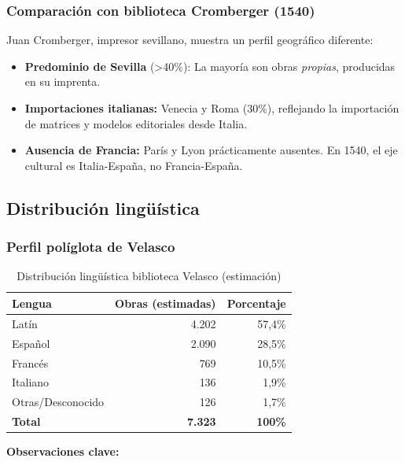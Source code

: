 \documentclass[12pt,a4paper]{article}
\begin{document}
\subsubsection{Comparación con biblioteca Cromberger (1540)}

Juan Cromberger, impresor sevillano, muestra un perfil geográfico diferente:

\begin{itemize}
\item \textbf{Predominio de Sevilla} (>40\%): La mayoría son obras \textit{propias}, producidas en su imprenta.

\item \textbf{Importaciones italianas:} Venecia y Roma (30\%), reflejando la importación de matrices y modelos editoriales desde Italia.

\item \textbf{Ausencia de Francia:} París y Lyon prácticamente ausentes. En 1540, el eje cultural es Italia-España, no Francia-España.
\end{itemize}

\subsection{Distribución lingüística}

\subsubsection{Perfil políglota de Velasco}

\begin{table}[h]
\centering
\begin{tabular}{lrr}
\toprule
\textbf{Lengua} & \textbf{Obras (estimadas)} & \textbf{Porcentaje} \\
\midrule
Latín & 4.202 & 57,4\% \\
Español & 2.090 & 28,5\% \\
Francés & 769 & 10,5\% \\
Italiano & 136 & 1,9\% \\
Otras/Desconocido & 126 & 1,7\% \\
\midrule
\textbf{Total} & \textbf{7.323} & \textbf{100\%} \\
\bottomrule
\end{tabular}
\caption{Distribución lingüística biblioteca Velasco (estimación)}
\label{tab:lenguas}
\end{table}

\textbf{Observaciones clave:}
\end{document}
